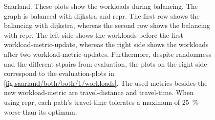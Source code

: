         \begin{figure}[hbp]
            \centering%
            \hfill%

            \hfill%
            \caption[Workloads on the balanced graph of Saarland]{%
                Saarland.
                These plots show the workloads during \gls{balancing}.
                The graph is balanced with \gls{dijkstra} and \gls{repr}.
                The first row shows the \gls{balancing} with \gls{dijkstra}, whereas the second row shows the \gls{balancing} with \gls{repr}.
                The left side shows the workloads before the first workload-\gls{metric}-update, whereas the right side shows the workloads after two workload-\gls{metric}-updates.
                Furthermore, despite randomness and the different \glspl{stpair} from evaluation, the plots on the right side correspond to the evaluation-plots in \vref{fig:saarland/both/both/1/workloads}.
                The used \glspl{metric} besides the new workload-\gls{metric} are travel-distance and travel-time.
                When using \gls{repr}, each path's travel-time tolerates a maximum of \si{\num{25} \percent} worse than its optimum.
                \label{fig:saarland/both/0/workloads}
                \label{fig:saarland/both/2/workloads}
            }
        \end{figure}

